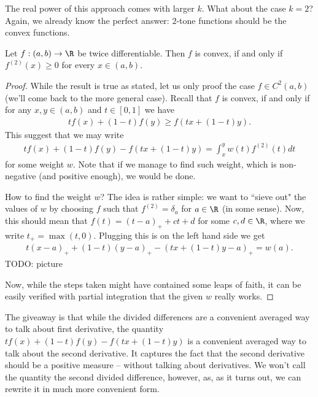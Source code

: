 The real power of this approach comes with larger $k$. What about the case $k = 2$? Again, we already know the perfect answer: $2$-tone functions should be the convex functions.

\begin{lause}\label{2-tone}
	Let $f : (a, b) \to \R$ be twice differentiable. Then $f$ is convex, if and only if $f^{(2)}(x) \geq 0$ for every $x \in (a, b)$.
\end{lause}

\begin{proof}
	While the result is true as stated, let us only proof the case $f \in C^{2}(a, b)$ (we'll come back to the more general case). Recall that $f$ is convex, if and only if for any $x, y \in (a, b)$ and $t \in [0, 1]$ we have
	\begin{align*}
		t f(x) + (1 - t) f(y) \geq f(t x + (1 - t)y).
	\end{align*}
	This suggest that we may write
	\begin{align*}
		t f(x) + (1 - t) f(y) - f(t x + (1 - t)y) = \int_{x}^{y} w(t) f^{(2)}(t) dt
	\end{align*}
	for some weight $w$. Note that if we manage to find such weight, which is non-negative (and positive enough), we would be done.

	How to find the weight $w$? The idea is rather simple: we want to ``sieve out" the values of $w$ by choosing $f$ such that $f^{(2)} = \delta_{a}$ for $a \in \R$ (in some sense). Now, this should mean that $f(t) = (t - a)_{+} + c t + d$ for some $c, d \in \R$, where we write $t_{+} = \max(t, 0)$. Plugging this is on the left hand side we get
	\begin{align*}
		t (x - a)_{+} + (1 - t) (y - a)_{+} - (t x + (1 - t) y - a)_{+} = w(a).
	\end{align*}
	TODO: picture

	Now, while the steps taken might have contained some leaps of faith, it can be easily verified with partial integration that the given $w$ really works.
\end{proof}

The giveaway is that while the divided differences are a convenient averaged way to talk about first derivative, the quantity $tf(x) + (1 - t) f(y) - f(t x + (1 - t)y)$ is a convenient averaged way to talk about the second derivative. It captures the fact that the second derivative should be a positive measure -- without talking about derivatives. We won't call the quantity the second divided difference, however, as, as it turns out, we can rewrite it in much more convenient form.

